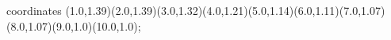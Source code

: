 					coordinates { (1.0,1.39)(2.0,1.39)(3.0,1.32)(4.0,1.21)(5.0,1.14)(6.0,1.11)(7.0,1.07)(8.0,1.07)(9.0,1.0)(10.0,1.0)};